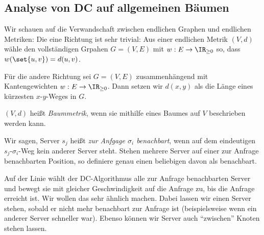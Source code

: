 \documentclass[language=ngerman,algolist]{TemplateLecture}
\begin{document}

\subsection{Analyse von DC auf allgemeinen Bäumen}

Wir schauen auf die Verwandschaft zwischen endlichen Graphen und endlichen Metriken: Die eine Richtung ist sehr trivial: Aus einer endlichen Metrik $(V,d)$ wähle den vollständigen Grpahen $G = (V, E)$ mit $w: E \to \IR_{\geq 0}$ so, dass $w(\set{u,v}) = d(u,v)$.

Für die andere Richtung sei $G = (V, E)$ zusammenhängend mit Kantengewichten $w: E \to \IR_{\geq 0}$. Dann setzen wir $d(x,y)$ als die Länge eines kürzesten $x$-$y$-Weges in $G$.

$(V,d)$ heißt \emph{Baummetrik}, wenn sie mithilfe eines Baumes auf $V$ beschrieben werden kann.

Wir sagen, Server $s_j$ heißt \emph{zur Anfgage $\sigma_i$ benachbart}, wenn auf dem eindeutigen $s_j$-$\sigma_i$-Weg kein anderer Server steht. Stehen mehrere Server auf einer zur Anfrage benachbarten Position, so definiere genau einen beliebigen davon als benachbart.

Auf der Linie wählt der DC-Algorithmus alle zur Anfrage benachbarten Server und bewegt sie mit gleicher Geschwindigkeit auf die Anfrage zu, bis die Anfrage erreicht ist. Wir wollen das sehr ähnlich machen. Dabei lassen wir einen Server stehen, sobald er nicht mehr benachbart zur Anfrage ist (beispielsweise wenn ein anderer Server schneller war). Ebenso können wir Server auch \enquote{zwischen} Knoten stehen lassen.
\end{document}

